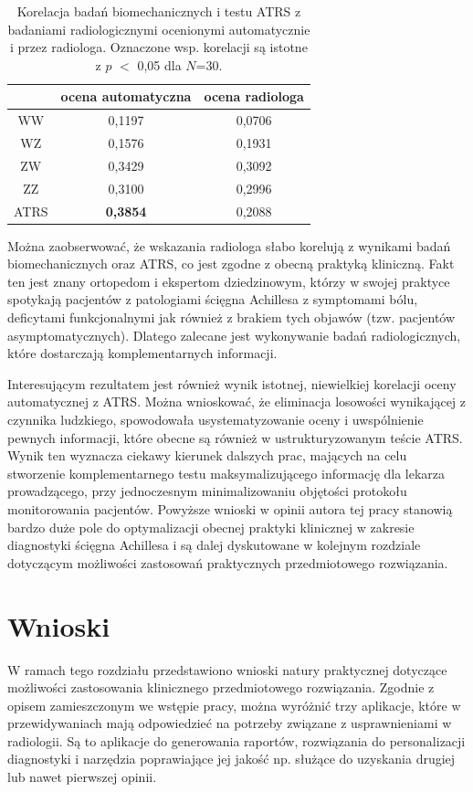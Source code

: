 \begin{table}[h]
	\centering
	\setlength{\tabcolsep}{3pt}
	\setlength\extrarowheight{2pt}
	\caption{Korelacja badań biomechanicznych i testu ATRS z badaniami radiologicznymi ocenionymi automatycznie i przez radiologa. Oznaczone wsp. korelacji są istotne z $p$ $<$ 0,05 dla $N$=30.}
	\label{tab:bioATRSvspredGT}
	\begin{tabular}{c|c|c}
		&ocena automatyczna&ocena radiologa \\
		\hline \hline
		WW&0,1197&0,0706\\
		\hline
		WZ&0,1576&0,1931\\
		\hline
		ZW&0,3429&0,3092\\
		\hline
		ZZ&0,3100&0,2996\\
		\hline
		ATRS&\textbf{0,3854}&0,2088\\
		
	
	\end{tabular}
\end{table}

Można zaobserwować, że wskazania radiologa słabo korelują z wynikami badań biomechanicznych oraz ATRS, co jest zgodne z obecną praktyką kliniczną. Fakt ten jest znany ortopedom i ekspertom dziedzinowym, którzy w swojej praktyce spotykają pacjentów z patologiami ścięgna Achillesa z symptomami bólu, deficytami funkcjonalnymi jak również z brakiem tych objawów (tzw. pacjentów asymptomatycznych). Dlatego zalecane jest wykonywanie badań radiologicznych, które dostarczają komplementarnych informacji. 

Interesującym rezultatem jest również wynik istotnej, niewielkiej korelacji oceny automatycznej z ATRS. Można wnioskować, że eliminacja losowości wynikającej \linebreak z czynnika ludzkiego, spowodowała usystematyzowanie oceny i uwspólnienie pewnych informacji, które obecne są również w ustrukturyzowanym teście ATRS. Wynik ten wyznacza ciekawy kierunek dalszych prac, mających na celu stworzenie komplementarnego testu maksymalizującego informację dla lekarza prowadzącego, przy jednoczesnym minimalizowaniu objętości protokołu monitorowania pacjentów. Powyższe wnioski w opinii autora tej pracy stanowią bardzo duże pole do optymalizacji obecnej praktyki klinicznej w zakresie diagnostyki ścięgna Achillesa i są dalej dyskutowane w kolejnym rozdziale dotyczącym możliwości zastosowań praktycznych przedmiotowego rozwiązania.

\chapter{Wnioski}
\label{seq:wnioski}
W ramach tego rozdziału przedstawiono wnioski natury praktycznej dotyczące możliwości zastosowania klinicznego przedmiotowego rozwiązania. Zgodnie z opisem zamieszczonym we wstępie pracy, można wyróżnić trzy aplikacje, które w przewidywaniach mają odpowiedzieć na potrzeby związane z usprawnieniami w radiologii. Są to aplikacje do generowania raportów, rozwiązania do personalizacji diagnostyki i narzędzia poprawiające jej jakość np. służące do uzyskania drugiej lub nawet pierwszej opinii.

